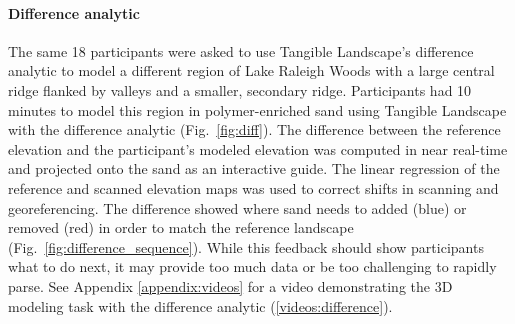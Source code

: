 \documentclass[prodmode,acmtochi]{acmsmall} %
\begin{document}

\paragraph{Difference analytic}
The same 18 participants were asked to use 
Tangible Landscape's difference analytic to model 
a different region of Lake Raleigh Woods
with a large central ridge 
flanked by valleys 
and a smaller, secondary ridge.
Participants had 10 minutes to model this region
in polymer-enriched sand using Tangible Landscape 
with the difference analytic (Fig.~\ref{fig:diff}). 
The difference between the reference elevation 
and the participant's modeled elevation %
was computed in near real-time and projected onto the sand 
as an interactive guide.
The linear regression of the reference and scanned elevation maps was used
to correct shifts in scanning and georeferencing. 
The difference showed where sand needs to added (blue) or removed (red) 
in order to match the reference landscape (Fig.~\ref{fig:difference_sequence}). 
While this feedback should show participants what to do next, 
it may provide too much data or be too challenging to rapidly parse.
%
See Appendix \ref{appendix:videos}
for a video demonstrating the 3D modeling task with the difference analytic (\ref{videos:difference}).

\end{document}
